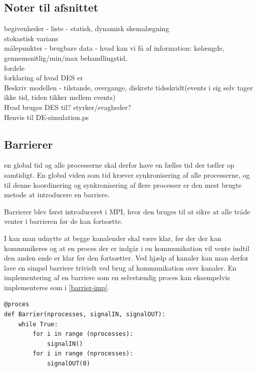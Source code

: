 \subsection*{Noter til afsnittet}
begivenheder - liste - statisk, dynamisk skemalægning \\
stokastisk varians\\
målepunkter - brugbare data - hvad kan vi få af information: kølængde, gennemsnitlig/min/max behandlingstid, \\
fordele\\
forklaring af hvad DES er\\
Beskriv modellen - tilstande, overgange, diskrete tidsskridt(events i sig selv tager ikke tid, tiden tikker mellem events)\\
Hvad bruges DES til? styrker/svagheder?\\
Henvis til DE-simulation.ps\\

\subsection{Barrierer} \label{sec:barrierer}
  en 
global tid og alle processerne skal derfor have en fælles tid der tæller op 
samtidigt.  En global viden som tid kræver synkronisering af alle 
processerne, og til denne koordinering og synkronisering af flere 
processer er den mest brugte metode at introducere en barriere.

Barrierer blev først introduceret i MPI, hvor den bruges til at 
sikre at alle tråde venter i barrieren før de kan fortsætte. 

I  kan man udnytte at begge 
kanalender skal være klar, før der der kan kommunikeres og at en proces der er 
indgår i en kommunikation vil vente indtil den anden ende er klar før den 
fortsætter.  Ved hjælp af kanaler kan man derfor lave en simpel barriere 
trivielt ved brug af kommunikation over kanaler.  En implementering af en 
barriere som en selvstændig proces kan eksempelvis implementeres som i 
\cref{barrier-imp}.

\begin{lstlisting}[float, label=barrier-imp,caption=En barriere i \pycsp]
@proces
def Barrier(nprocesses, signalIN, signalOUT):
	while True:
		for i in range (nprocesses):
			signalIN()
		for i in range (nprocesses):
			signalOUT(0)
\end{lstlisting}


